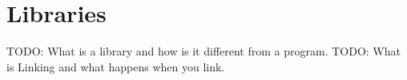 \chapter{Libraries}

TODO: What is a library and how is it different from a program.
TODO: What is Linking and what happens when you link.

